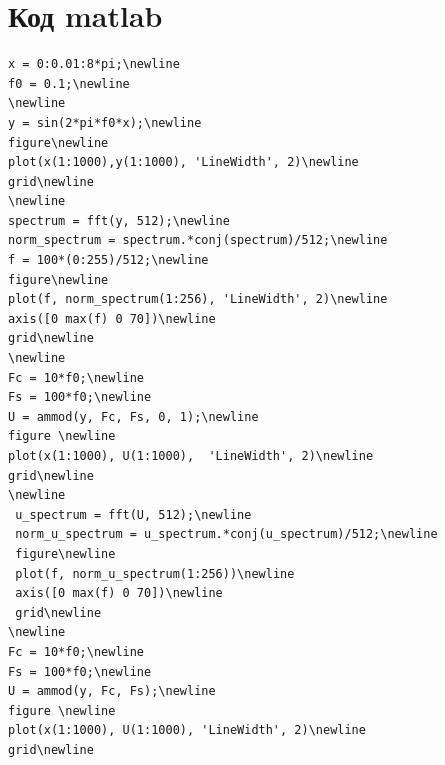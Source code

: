 \documentclass[10pt,a4paper]{report}
\begin{document}
\section{Код matlab}
\begin{verbatim}
x = 0:0.01:8*pi;\newline
f0 = 0.1;\newline
\newline
y = sin(2*pi*f0*x);\newline
figure\newline
plot(x(1:1000),y(1:1000), 'LineWidth', 2)\newline
grid\newline
\newline
spectrum = fft(y, 512);\newline
norm_spectrum = spectrum.*conj(spectrum)/512;\newline
f = 100*(0:255)/512;\newline
figure\newline
plot(f, norm_spectrum(1:256), 'LineWidth', 2)\newline
axis([0 max(f) 0 70])\newline
grid\newline
\newline
Fc = 10*f0;\newline
Fs = 100*f0;\newline
U = ammod(y, Fc, Fs, 0, 1);\newline
figure \newline
plot(x(1:1000), U(1:1000),  'LineWidth', 2)\newline
grid\newline
\newline
 u_spectrum = fft(U, 512);\newline
 norm_u_spectrum = u_spectrum.*conj(u_spectrum)/512;\newline
 figure\newline
 plot(f, norm_u_spectrum(1:256))\newline
 axis([0 max(f) 0 70])\newline
 grid\newline
\newline
Fc = 10*f0;\newline
Fs = 100*f0;\newline
U = ammod(y, Fc, Fs);\newline
figure \newline
plot(x(1:1000), U(1:1000), 'LineWidth', 2)\newline
grid\newline

\end{verbatim}
\end{document}
